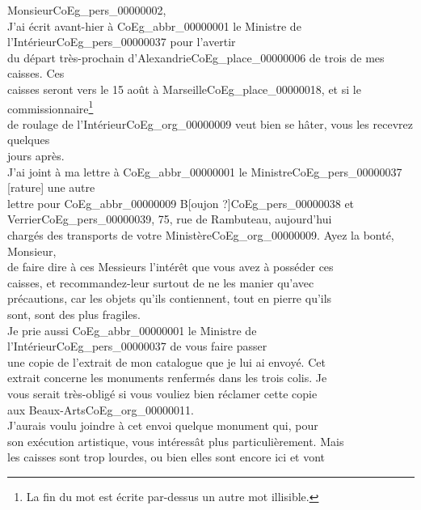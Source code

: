 \documentclass{book}
\begin{document}
\hspace{1cm}Monsieur\gls{CoEg_pers_00000002},\\

\indent J’ai écrit avant-hier à \gls{CoEg_abbr_00000001} le Ministre de l’Intérieur\gls{CoEg_pers_00000037} pour l’avertir\\
du départ très-prochain d’Alexandrie\gls{CoEg_place_00000006} de trois de mes caisses. Ces\\
caisses seront vers le 15 août à Marseille\gls{CoEg_place_00000018}, et si le commissionnaire\footnote{La fin du mot est écrite par-dessus un autre mot illisible.}\\
de roulage de l’Intérieur\gls{CoEg_org_00000009} veut bien se hâter, vous les recevrez quelques\\
jours après.\\
\indent J’ai joint à ma lettre à \gls{CoEg_abbr_00000001} le Ministre\gls{CoEg_pers_00000037} [rature] une autre\\
lettre pour \gls{CoEg_abbr_00000009} B{[oujon ?]}\gls{CoEg_pers_00000038} et Verrier\gls{CoEg_pers_00000039}, 75, rue de Rambuteau, aujourd’hui\\
chargés des transports de votre Ministère\gls{CoEg_org_00000009}. Ayez la bonté, Monsieur,\\
de faire dire à ces Messieurs l’intérêt que vous avez à posséder ces\\
caisses, et recommandez-leur surtout de ne les manier qu’avec\\
précautions, car les objets qu’ils contiennent, tout en pierre qu’ils\\
sont, sont des plus fragiles.\\
\indent Je prie aussi \gls{CoEg_abbr_00000001} le Ministre de l’Intérieur\gls{CoEg_pers_00000037} de vous faire passer\\
une copie de l’extrait de mon catalogue que je lui ai envoyé. Cet\\
extrait concerne les monuments renfermés dans les trois colis. Je\\
vous serait très-obligé si vous vouliez bien réclamer cette copie\\
aux Beaux-Arts\gls{CoEg_org_00000011}.\\
\indent J’aurais voulu joindre à cet envoi quelque monument qui, pour\\
son exécution artistique, vous intéressât plus particulièrement. Mais\\
les caisses sont trop lourdes, ou bien elles sont encore ici et vont\\
\end{document}
